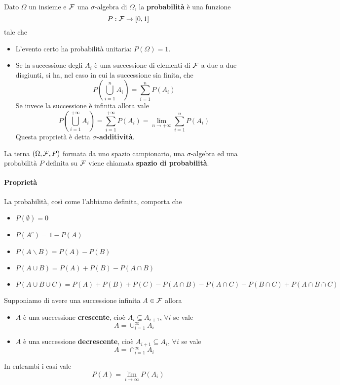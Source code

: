 \begin{definition}
	Dato $\Omega$ un insieme e $\mathcal{F}$ una $\sigma$-algebra di $\Omega$, la \textbf{probabilità} è
	una funzione
	\[ P : \mathcal{F} \to [0, 1] \]
	tale che
	\begin{itemize}
		\item L'evento certo ha probabilità unitaria: $P(\Omega) = 1$.
		\item Se la successione degli $A_i$ è una successione di elementi di $\mathcal{F}$ a due a due
		      disgiunti, si ha, nel caso in cui la successione sia finita, che
		      \[ P \left( \bigcup_{i=1}^n A_i \right) = \sum_{i=1}^n P(A_i) \]
		      Se invece la successione è infinita allora vale
		      \[
			      P \left( \bigcup_{i=1}^{+\infty} A_i \right) = \sum_{i=1}^{+\infty} P(A_i) =
			      \lim_{n \to +\infty} \sum_{i=1}^n P(A_i)
		      \]
		      Questa proprietà è detta $\sigma$\textbf{-additività}.
	\end{itemize}
\end{definition}

\begin{definition}
	La terna $(\Omega, \mathcal{F}, P)$ formata da uno spazio campionario, una $\sigma$-algebra ed una
	probabilità $P$ definita su $\mathcal{F}$ viene chiamata \textbf{spazio di probabilità}.
\end{definition}

\paragraph{Proprietà} La probabilità, così come l'abbiamo definita, comporta che
\begin{itemize}
	\item $P(\emptyset) = 0$
	\item $P(A^c) = 1 - P(A)$
	\item $P(A \backslash B) = P(A) - P(B)$
	\item $P(A \cup B) = P(A) + P(B) - P(A \cap B)$
	\item $P(A \cup B \cup C) = P(A) + P(B) + P(C) -
		      P(A \cap B) - P(A \cap C) - P(B \cap C) + P(A \cap B \cap C)$
\end{itemize}

\begin{proposition}
	Supponiamo di avere una successione infinita $A \in \mathcal{F}$	allora
	\begin{itemize}
		\item $A$ è una successione \textbf{crescente}, cioè $A_i \subseteq A_{i+1}$, $\forall i$
		      se vale
		      \[ A = \cup_{i=1}^\infty A_i \]
		\item $A$ è una successione \textbf{decrescente}, cioè $A_{i+1} \subseteq A_i$,
		      $\forall i$ se vale
		      \[ A = \cap_{i=1}^\infty A_i \]
	\end{itemize}
	In entrambi i casi vale
	\[ P(A) = \lim_{i \to \infty} P(A_i) \]
\end{proposition}


